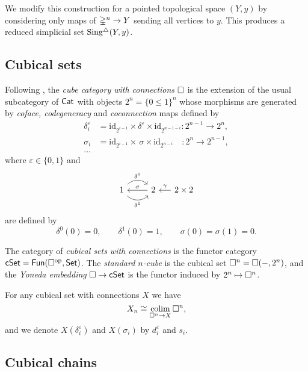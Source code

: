 We modify this construction for a pointed topological space $(Y, y)$ by considering only maps of $\mathbb{\Delta}^n \to Y$ sending all vertices to $y$.
This produces a reduced simplicial set $\operatorname{Sing^{\triangle}}(Y, y)$.

\subsection{Cubical sets} \label{ss:cubical sets}

Following \cite{brown1981cubes}, the \textit{cube category with connections} $\square$ is the extension of the usual subcategory of $\mathsf{Cat}$ with objects $2^n = \{0 \leq 1\}^n$ whose morphisms are generated by \textit{coface, codegeneracy} and \textit{coconnection} maps defined by
\begin{align*}
\delta_i^\varepsilon & = \mathrm{id}_{2^{i-1}} \times \delta^\varepsilon \times \mathrm{id}_{2^{n-1-i}} \colon 2^{n-1} \to 2^n, \\
\sigma_i & = \mathrm{id}_{2^{i-1}} \times \, \sigma \times \mathrm{id}_{2^{n-i}} \quad \colon 2^{n} \to 2^{n-1}, \\
... &
\end{align*}
where $\varepsilon \in \{0,1\}$ and
\begin{equation*}
\begin{tikzcd}
1 \arrow[r, out=45, in=135, "\delta^0"] \arrow[r, out=-45, in=-135, "\delta^1"'] & 2 \arrow[l, "\sigma"'] &[-10pt] \arrow[l, "\gamma"'] 2 \times 2
\end{tikzcd}
\end{equation*}
are defined by
\begin{equation*}
\delta^0(0) = 0, \qquad \delta^1(0) = 1, \qquad \sigma(0) = \sigma(1) = 0.
\end{equation*}

The category of \textit{cubical sets with connections} is the functor category $\mathsf{cSet} = \mathsf{Fun}(\square^{\mathrm{op}}, \mathsf{Set})$.
The \textit{standard $n$-cube} is the cubical set $\square^n = \square(-, 2^n)$, and the \textit{Yoneda embedding} $\square \to \mathsf{cSet}$ is the functor induced by $2^n \mapsto \square^n$.

For any cubical set with connections $X$ we have
\begin{equation*}
X_n \cong \operatorname*{colim}_{\square^n \to X} \square^n,
\end{equation*}
and we denote $X(\delta_i^\varepsilon)$ and $X(\sigma_i)$ by $d_i^\varepsilon$ and $s_i$.

\subsection{Cubical chains}

